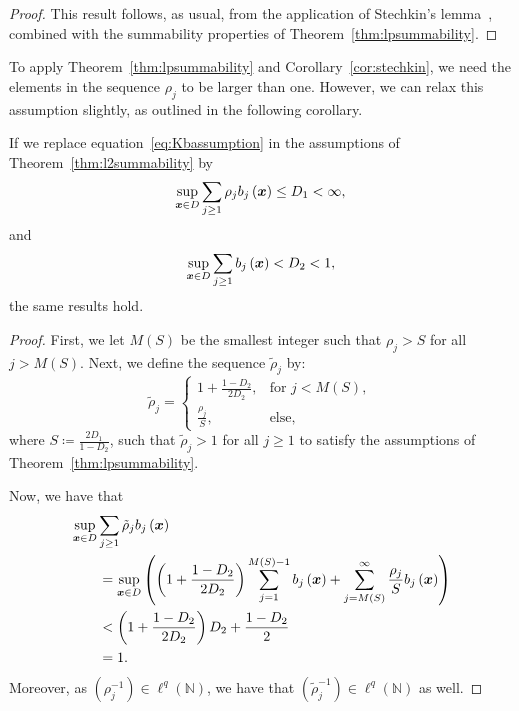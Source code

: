 \begin{proof}
	This result follows, as usual, from the application of Stechkin's lemma~\cite{devore1998,gogoladze2022}, combined with the summability properties of Theorem~\ref{thm:lpsummability}.
\end{proof}

To apply Theorem~\ref{thm:lpsummability} and Corollary~\ref{cor:stechkin}, we need the elements in the sequence $\rho_j$ to be larger than one.
However, we can relax this assumption slightly, as outlined in the following corollary.

\begin{corollary}\label{cor:looserho}
If we replace equation~\eqref{eq:Kbassumption} in the assumptions of Theorem~\ref{thm:l2summability} by
\begin{equation*}
	\sup_{{{\bm{x}}}\in D}\sum_{j \geq 1} \rho_j b_j\left({{\bm{x}}} \right) \leq D_1 < \infty,
\end{equation*}
and
\begin{equation*}
	\sup_{{{\bm{x}}}\in D}\sum_{j \geq 1} b_j\left({{\bm{x}}} \right) < D_2 < 1,
\end{equation*}
the same results hold.
\end{corollary}
\begin{proof}
	First, we let $M(S)$ be the smallest integer such that $\rho_j > S$ for all $j > M(S)$.
	Next, we define the sequence $\tilde{\rho}_j$ by:
	\begin{equation*}
		\tilde{\rho}_j=\begin{cases}
						   1+\frac{1-D_2}{2D_2},   & \text{for }j < M(S),\\
						   \frac{\rho_j}{S},   & \text{else},
		\end{cases}
	\end{equation*}
	where $S\coloneqq\frac{2D_1}{1-D_2 }$, such that $\tilde{\rho}_j> 1$ for all $j \geq 1$ to satisfy the assumptions of Theorem~\ref{thm:lpsummability}.

	Now, we have that
	\begin{align*}
		&\sup_{{{\bm{x}}}\in D}\sum_{j \geq 1} \tilde{\rho}_j b_j\left({{\bm{x}}} \right) \\
		&\qquad= \sup_{{{\bm{x}}}\in D}\left( \left(1 + \frac{1-D_2}{2D_2}\right) \sum_{j = 1}^{M(S) - 1} b_j\left({{\bm{x}}} \right)+\sum_{j = M(S) }^\infty \frac{\rho_j}{S} b_j\left({{\bm{x}}} \right) \right)\\
		&\qquad<  \left(1 + \frac{1-D_2}{2D_2}\right)D_2+\frac{1-D_2 }{2}\\
		&\qquad=1.
	\end{align*}
	Moreover, as $\left( \rho_j^{-1} \right) \in \ell^q(\mathbb{N})$, we have that $\left( \tilde{\rho}_j^{-1} \right) \in \ell^q(\mathbb{N})$ as well.
\end{proof}

